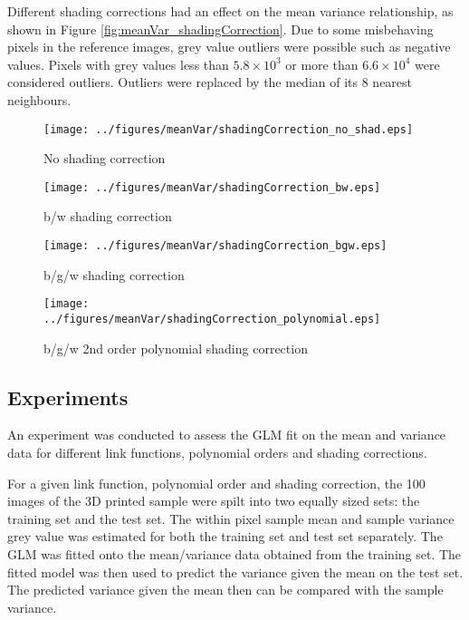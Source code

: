 \documentclass[a4paper]{proc}
\begin{document}
Different shading corrections had an effect on the mean variance relationship, as shown in Figure \ref{fig:meanVar_shadingCorrection}. Due to some misbehaving pixels in the reference images, grey value outliers were possible such as negative values. Pixels with grey values less than $5.8\times 10^3$ or more than $6.6\times 10^4$ were considered outliers. Outliers were replaced by the median of its 8 nearest neighbours.

\begin{figure*}
	\centering
	\begin{subfigure}{0.45\textwidth}
		\centering
		\texttt{[image: ../figures/meanVar/shadingCorrection\_no\_shad.eps]}
		\caption{No shading correction}
	\end{subfigure}
	\begin{subfigure}{0.45\textwidth}
		\centering
		\texttt{[image: ../figures/meanVar/shadingCorrection\_bw.eps]}
		\caption{b/w shading correction}
	\end{subfigure}
	\begin{subfigure}{0.45\textwidth}
		\centering
		\texttt{[image: ../figures/meanVar/shadingCorrection\_bgw.eps]}
		\caption{b/g/w shading correction}
	\end{subfigure}
	\begin{subfigure}{0.45\textwidth}
		\centering
		\texttt{[image: ../figures/meanVar/shadingCorrection\_polynomial.eps]}
		\caption{b/g/w 2nd order polynomial shading correction}
	\end{subfigure}
	\caption{Post shading correction mean and variance frequency density plot of each pixel's grey value in the segmented image of the 3D printed sample. A Gamma GLM was fitted with the identity link. The solid and dotted lines are the mean response and the $\Phi(\pm 1)$ quantiles respectively.}
	\label{fig:meanVar_shadingCorrection}
\end{figure*}

\subsection{Experiments}

An experiment was conducted to assess the GLM fit on the mean and variance data for different link functions, polynomial orders and shading corrections.

For a given link function, polynomial order and shading correction, the 100 images of the 3D printed sample were spilt into two equally sized sets: the training set and the test set. The within pixel sample mean and sample variance  grey value was estimated for both the training set and test set separately. The GLM was fitted onto the mean/variance data obtained from the training set. The fitted model was then used to predict the variance given the mean on the test set. The predicted variance given the mean then can be compared with the sample variance.
\end{document}
